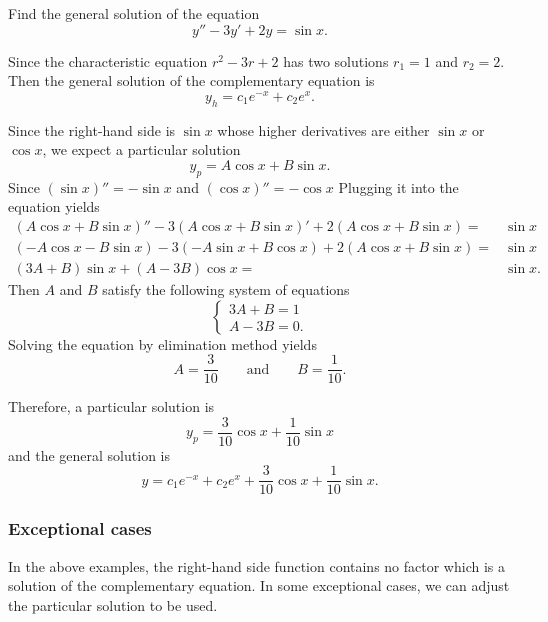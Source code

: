 \begin{example}
  Find the general solution of the equation
  \[y''-3y'+2y=\sin x.\]
\end{example}
\begin{solution}
Since the characteristic equation $r^2-3r+2$ has two solutions $r_1=1$ and $r_2=2$. Then the general solution of the complementary equation is
\[y_h=c_1e^{-x}+c_2e^x.\]

Since the right-hand side is $\sin x$ whose higher derivatives are either $\sin x$ or $\cos x$, we expect a particular solution
\[y_p=A\cos x+B\sin x.\]
Since $(\sin x)''=-\sin x$ and $(\cos x)''=-\cos x$
Plugging it into the equation yields
\[
\begin{aligned}
  (A\cos x+B\sin x)''-3(A\cos x+B\sin x)'+2(A\cos x+B\sin x)=&\sin x\\
  (-A\cos x-B\sin x)-3(-A\sin x+B\cos x)+2(A\cos x+B\sin x)=&\sin x\\
 (3A+B)\sin x+(A-3B)\cos x=&\sin x.
\end{aligned}  
\]
Then $A$ and $B$ satisfy the following system of equations
\[
\begin{cases}
  3A+B=1\\
  A-3B=0.
\end{cases}  
\]
Solving the equation by elimination method yields
\[A=\frac{3}{10}\qquad\text{and}\qquad B=\frac{1}{10}.\]

Therefore, a particular solution is
\[y_p=\frac{3}{10}\cos x+\frac{1}{10}\sin x\]
and the general solution is
\[y=c_1e^{-x}+c_2e^x+\frac{3}{10}\cos x+\frac{1}{10}\sin x.\]
\end{solution}

\subsubsection{Exceptional cases}

In  the above examples, the right-hand side function contains no factor which is a solution of the complementary equation. In some exceptional cases, we can adjust the particular solution to be used.

